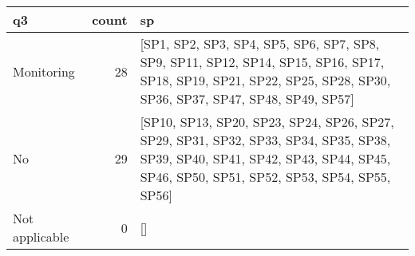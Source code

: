 \begin{tabular}{lrl}
\toprule
             q3 &  count &                                                                                                                                                                              sp \\
\midrule
     Monitoring &     28 &                 [SP1, SP2, SP3, SP4, SP5, SP6, SP7, SP8, SP9, SP11, SP12, SP14, SP15, SP16, SP17, SP18, SP19, SP21, SP22, SP25, SP28, SP30, SP36, SP37, SP47, SP48, SP49, SP57] \\
             No &     29 &  [SP10, SP13, SP20, SP23, SP24, SP26, SP27, SP29, SP31, SP32, SP33, SP34, SP35, SP38, SP39, SP40, SP41, SP42, SP43, SP44, SP45, SP46, SP50, SP51, SP52, SP53, SP54, SP55, SP56] \\
 Not applicable &      0 &                                                                                                                                                                              [] \\
\bottomrule
\end{tabular}
